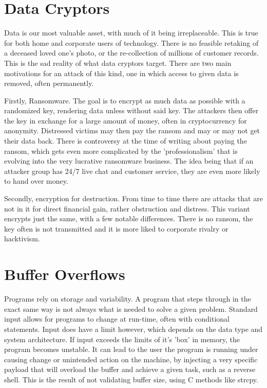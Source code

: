 \citep{PentestMonkey}
\citep{MSFVenom}
\citep{Pwncat}


\section{Data Cryptors}
Data is our most valuable asset, with much of it being irreplaceable. This is true for both home and corporate users of technology. There is no feasible retaking of a deceased loved one's photo, or the re-collection of millions of customer records. This is the sad reality of what data cryptors target.
There are two main motivations for an attack of this kind, one in which access to given data is removed, often permanently. 

Firstly, Ransomware. The goal is to encrypt as much data as possible with a randomized key, rendering data unless without said key. The attackers then offer the key in exchange for a large amount of money, often in cryptocurrency for anonymity. Distressed victims may then pay the ransom and may or may not get their data back.
There is controversy at the time of writing about paying the ransom, which gets even more complicated by the 'professionalism' that is evolving into the very lucrative ransomware business. The idea being that if an attacker group has 24/7 live chat and customer service, they are even more likely to hand over money.

Secondly, encryption for destruction. From time to time there are attacks that are not in it for direct financial gain, rather obstruction and distress. This variant encrypts just the same, with a few notable differences. There is no ransom, the key often is not transmitted and it is more liked to corporate rivalry or hacktivism.


\section{Buffer Overflows}
Programs rely on storage and variability. A program that steps through in the exact same way is not always what is needed to solve a given problem. Standard input allows for programs to change at run-time, often with conditional statements. Input does have a limit however, which depends on the data type and system architecture.
If input exceeds the limits of it's 'box' in memory, the program becomes unstable. It can lead to the user the program is running under causing change or unintended action on the machine, by injecting a very specific payload that will overload the buffer and achieve a given task, such as a reverse shell. This is the result of not validating
buffer size, using C methods like strcpy. \citep{strcpy}

